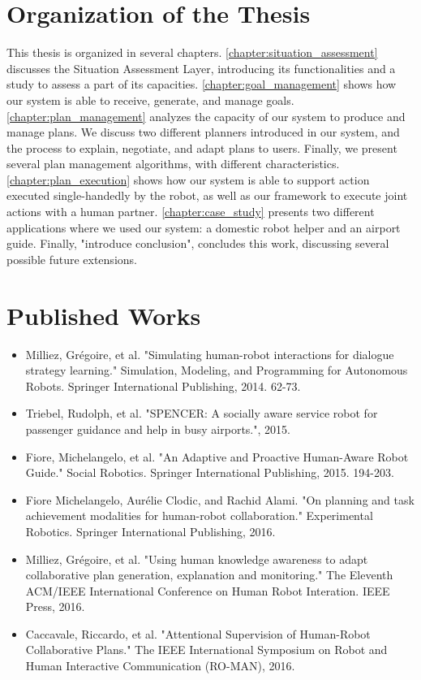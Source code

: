 \section{Organization of the Thesis}
This thesis is organized in several chapters. \ref{chapter:situation_assessment} discusses the Situation Assessment Layer, introducing its functionalities and a study to assess a part of its capacities. \ref{chapter:goal_management} shows how our system is able to receive, generate, and manage goals. \ref{chapter:plan_management} analyzes the capacity of our system to produce and manage plans. We discuss two different planners introduced in our system, and the process to explain, negotiate, and adapt plans to users. Finally, we present several plan management algorithms, with different characteristics. \ref{chapter:plan_execution} shows how our system is able to support action executed single-handedly by the robot, as well as our framework to execute joint actions with a human partner. \ref{chapter:case_study} presents two different applications where we used our system: a domestic robot helper and an airport guide. Finally, "introduce conclusion", concludes this work, discussing several possible future extensions. 

\section{Published Works}
\begin{itemize}
\item Milliez, Grégoire, et al. "Simulating human-robot interactions for dialogue strategy learning." Simulation, Modeling, and Programming for Autonomous Robots. Springer International Publishing, 2014. 62-73.
\item Triebel, Rudolph, et al. "SPENCER: A socially aware service robot for passenger guidance and help in busy airports.", 2015.
\item Fiore, Michelangelo, et al. "An Adaptive and Proactive Human-Aware Robot Guide." Social Robotics. Springer International Publishing, 2015. 194-203.
\item Fiore Michelangelo, Aurélie Clodic, and Rachid Alami. "On planning and task achievement modalities for human-robot collaboration." Experimental Robotics. Springer International Publishing, 2016.
\item Milliez, Grégoire, et al. "Using human knowledge awareness to adapt collaborative plan generation, explanation and monitoring." The Eleventh ACM/IEEE International Conference on Human Robot Interation. IEEE Press, 2016.
\item Caccavale, Riccardo, et al. "Attentional Supervision of Human-Robot Collaborative Plans." The IEEE International Symposium on Robot and Human Interactive Communication (RO-MAN), 2016.
\end{itemize}